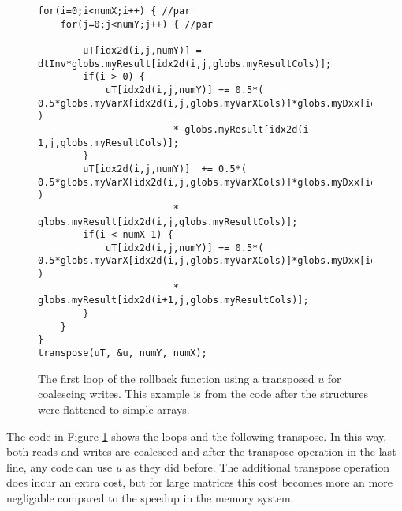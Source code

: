 \begin{figure}[H]
    \begin{lstlisting}
for(i=0;i<numX;i++) { //par
    for(j=0;j<numY;j++) { //par

        uT[idx2d(i,j,numY)] = dtInv*globs.myResult[idx2d(i,j,globs.myResultCols)];
        if(i > 0) {
            uT[idx2d(i,j,numY)] += 0.5*( 0.5*globs.myVarX[idx2d(i,j,globs.myVarXCols)]*globs.myDxx[idx2d(i,0,globs.myDxxCols)] )
                        * globs.myResult[idx2d(i-1,j,globs.myResultCols)];
        }
        uT[idx2d(i,j,numY)]  += 0.5*( 0.5*globs.myVarX[idx2d(i,j,globs.myVarXCols)]*globs.myDxx[idx2d(i,1,globs.myDxxCols)] )
                        * globs.myResult[idx2d(i,j,globs.myResultCols)];
        if(i < numX-1) {
            uT[idx2d(i,j,numY)] += 0.5*( 0.5*globs.myVarX[idx2d(i,j,globs.myVarXCols)]*globs.myDxx[idx2d(i,2,globs.myDxxCols)] )
                        * globs.myResult[idx2d(i+1,j,globs.myResultCols)];
        }
    }
}
transpose(uT, &u, numY, numX);
    \end{lstlisting}
    \caption{The first loop of the rollback function using a transposed $u$ for
    coalescing writes. This example is from the code after the structures were
    flattened to simple arrays.}
    \label{code:coal2}
\end{figure}

The code in Figure \ref{code:coal2} shows the loops and the following transpose.
In this way, both reads and writes are coalesced and after the transpose
operation in the last line, any code can use $u$ as they did before. The
additional transpose operation does incur an extra cost, but for large matrices
this cost becomes more an more negligable compared to the speedup in the memory
system.